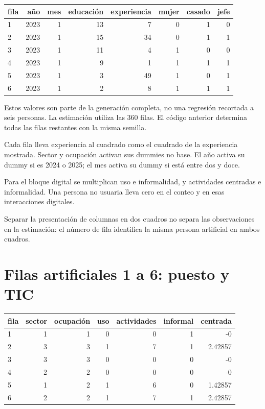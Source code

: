 \documentclass[11pt,a4paper]{article}
\begin{document}
\begin{center}\small
\begin{tabular}{lrrrrrrr}
\toprule
fila & año & mes & educación & experiencia & mujer & casado & jefe\\\midrule
1 & 2023 & 1 & 13 & 7 & 0 & 1 & 0\\
2 & 2023 & 1 & 15 & 34 & 0 & 1 & 1\\
3 & 2023 & 1 & 11 & 4 & 1 & 0 & 0\\
4 & 2023 & 1 & 9 & 1 & 1 & 1 & 1\\
5 & 2023 & 1 & 3 & 49 & 1 & 0 & 1\\
6 & 2023 & 1 & 2 & 8 & 1 & 1 & 1\\
\bottomrule
\end{tabular}\end{center}

Estos valores son parte de la generación completa, no una regresión recortada a seis personas. La estimación utiliza las 360 filas. El código anterior determina todas las filas restantes con la misma semilla.

Cada fila lleva experiencia al cuadrado como el cuadrado de la experiencia mostrada. Sector y ocupación activan sus dummies no base. El año activa su dummy si es 2024 o 2025; el mes activa su dummy si está entre dos y doce.

Para el bloque digital se multiplican uso e informalidad, y actividades centradas e informalidad. Una persona no usuaria lleva cero en el conteo y en esas interacciones digitales.

Separar la presentación de columnas en dos cuadros no separa las observaciones en la estimación: el número de fila identifica la misma persona artificial en ambos cuadros.

\clearpage
\section{Filas artificiales 1 a 6: puesto y TIC}

\begin{center}\small
\begin{tabular}{lrrrrrr}
\toprule
fila & sector & ocupación & uso & actividades & informal & centrada\\\midrule
1 & 1 & 1 & 0 & 0 & 1 & -0\\
2 & 3 & 3 & 1 & 7 & 1 & 2.42857\\
3 & 3 & 3 & 0 & 0 & 0 & -0\\
4 & 2 & 2 & 0 & 0 & 0 & -0\\
5 & 1 & 2 & 1 & 6 & 0 & 1.42857\\
6 & 2 & 2 & 1 & 7 & 1 & 2.42857\\
\bottomrule
\end{tabular}\end{center}
\end{document}

